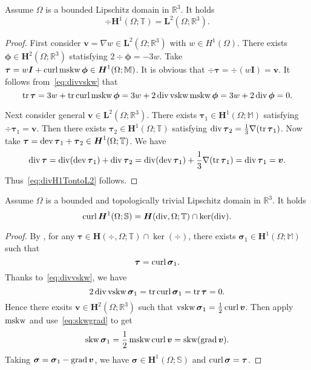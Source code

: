 \begin{lemma}
Assume $\Omega$ is a bounded Lipschitz domain in $\mathbb R^3$.
It holds
\begin{equation}\label{eq:divH1TontoL2}
\div\boldsymbol H^1(\Omega;\mathbb T)=\boldsymbol L^2(\Omega; \mathbb R^3).
\end{equation}
\end{lemma}
\begin{proof}
First consider $\boldsymbol v=\nabla w\in\boldsymbol L^2(\Omega; \mathbb R^3)$ with $w\in H^1(\Omega)$. There exists $\boldsymbol\phi\in \boldsymbol H^2(\Omega; \mathbb R^3)$ statisfying $2\div\boldsymbol\phi=-3w$. Take $\boldsymbol\tau=w\boldsymbol I+\operatorname{curl}\operatorname{mskw}\boldsymbol\phi\in\boldsymbol H^1(\Omega;\mathbb M)$. It is obvious that $\div\boldsymbol\tau=\div(w\boldsymbol I)=\boldsymbol v$. It follows from~\eqref{eq:divvskw} that
\[
\operatorname*{tr}\boldsymbol\tau=3w+\operatorname*{tr}\operatorname{curl}\operatorname{mskw}\boldsymbol\phi=3w+2\operatorname{div}\operatorname{vskw}\operatorname{mskw}\boldsymbol\phi=3w+2\operatorname{div}\boldsymbol\phi=0.
\]

Next consider general $\boldsymbol v\in\boldsymbol L^2(\Omega; \mathbb R^3)$. There exists $\boldsymbol\tau_1\in\boldsymbol H^1(\Omega; \mathbb M)$ satisfying $\div\boldsymbol\tau_1=\boldsymbol v$. Then there exists $\boldsymbol\tau_2\in\boldsymbol H^1(\Omega; \mathbb T)$ satisfying $\operatorname{div}\boldsymbol\tau_2=\frac{1}{3}\nabla(\operatorname*{tr}\boldsymbol\tau_1)$. Now take $\boldsymbol\tau=\operatorname{dev}\boldsymbol\tau_1+\boldsymbol\tau_2\in\boldsymbol H^1(\Omega; \mathbb T)$. We have
\[
\operatorname{div}\boldsymbol\tau=\operatorname{div}(\operatorname{dev}\boldsymbol\tau_1)+\operatorname{div}\boldsymbol\tau_2=\operatorname{div}(\operatorname{dev}\boldsymbol\tau_1)+\frac{1}{3}\nabla(\operatorname*{tr}\boldsymbol\tau_1)=\operatorname{div}\boldsymbol\tau_1=\boldsymbol v.
\]
Thus~\eqref{eq:divH1TontoL2} follows.
\end{proof}

\begin{lemma}
Assume $\Omega$ is a bounded and topologically trivial Lipschitz domain in $\mathbb R^3$.
It holds
\begin{equation}\label{eq:curlH1SontoDivfree}
\operatorname{curl}\boldsymbol H^1(\Omega;\mathbb S)=\boldsymbol H(\operatorname{div}, \Omega;\mathbb T)\cap\ker(\operatorname{div}).
\end{equation}
\end{lemma}
\begin{proof}
By \cite[Theorem 1.1]{CostabelMcIntosh2010}, for any $\boldsymbol\tau\in\boldsymbol H(\div, \Omega;\mathbb T)\cap\ker(\div)$, there exists $\boldsymbol \sigma_1 \in\boldsymbol H^1(\Omega;\mathbb M)$  such that
\[
\boldsymbol\tau=\operatorname{curl}\boldsymbol\sigma_1.
\]
Thanks to~\eqref{eq:divvskw}, we have
\[
2\operatorname{div}\operatorname{vskw}\boldsymbol\sigma_1=\operatorname*{tr}\operatorname{curl}\boldsymbol\sigma_1=\operatorname*{tr}\boldsymbol\tau=0.
\]
Hence there exsits $\boldsymbol v\in \boldsymbol H^2(\Omega; \mathbb R^3)$ such that $\operatorname{vskw}\boldsymbol\sigma_1=\frac{1}{2}\operatorname{curl}\boldsymbol v$. Then apply $\operatorname{mskw}$ and use~\eqref{eq:skwgrad} to get 
\[
\operatorname{skw}\boldsymbol\sigma_1=\frac{1}{2}\operatorname{mskw}\operatorname{curl}\boldsymbol v=\operatorname{skw}(\operatorname{grad}\boldsymbol v).
\]
Taking $\boldsymbol\sigma=\boldsymbol\sigma_1-\operatorname{grad}\boldsymbol v$, we have $\boldsymbol\sigma\in \boldsymbol H^1(\Omega; \mathbb S)$ and $\operatorname{curl}\boldsymbol\sigma=\boldsymbol\tau$.
\end{proof}


